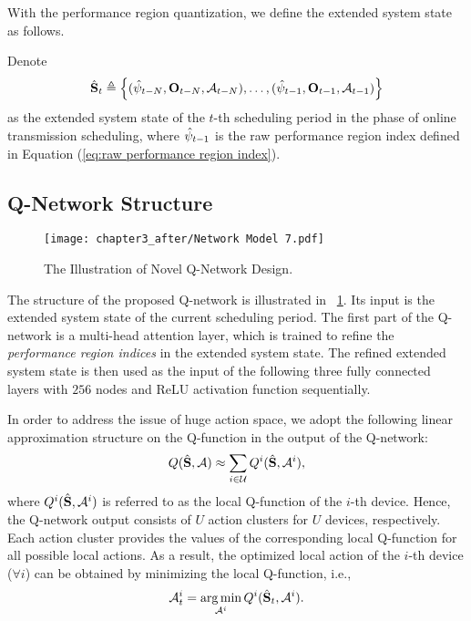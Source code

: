 With the performance region quantization, we define the extended system state as follows.
\begin{definition}
   Denote 
   $$
   \hat{\mathbf{S}}_t \triangleq 
   \left\{
      (\hat{\psi}_{t-N}, \mathbf{O}_{t-N},\mathcal{A}_{t-N})
      ,\ldots,
      (\hat{\psi}_{t-1}, \mathbf{O}_{t-1}, \mathcal{A}_{t-1})
   \right\}
   $$
   as the extended system state of the $t$-th scheduling period in the phase of online transmission scheduling, where $\hat{\psi}_{t-1}$ is the raw performance region index defined in Equation (\ref{eq:raw performance region index}).
\end{definition}

\subsection{Q-Network Structure}
\label{sec:Q-network}
\begin{figure}[!t]
   \centering
   \texttt{[image: chapter3\_after/Network Model 7.pdf]}
   \caption{The Illustration of Novel Q-Network Design.}
   \label{fig:Network Design}
\end{figure}

The structure of the proposed Q-network is illustrated in \figurename~\ref{fig:Network Design}. Its input is the extended system state of the current scheduling period. The first part of the Q-network is a multi-head attention layer\cite{vaswani2017attention},  which is trained to refine the \emph{performance region indices} in the extended system state. The refined extended system state is then used as the input of the following three fully connected layers with $256$ nodes and ReLU activation function sequentially.

In order to address the issue of huge action space, we adopt the following linear approximation structure on the Q-function in the output of the Q-network:
\begin{equation}
   Q(\hat{\mathbf{S}}, \mathcal{A})
   \approx
   \sum_{{i} \in \mathcal{U}} Q^{i}(\hat{\mathbf{S}}, \mathcal{A}^{i}),
\end{equation}
where $Q^{i}(\hat{\mathbf{S}}, \mathcal{A}^{i})$ is referred to as the local Q-function of the ${i}$-th device. Hence, the Q-network output consists of $U$ action clusters for $U$ devices, respectively. Each action cluster provides the values of the corresponding local Q-function for all possible local actions. As a result, the optimized local action of the $i$-th device ($\forall i$) can be obtained by minimizing the local Q-function, i.e.,
\begin{equation}
   \mathcal{A}^{i}_t = \operatorname*{arg\,min}\limits_{\mathcal{A}^{i}} Q^{i}(\hat{\mathbf{S}}_t, \mathcal{A}^{i}).
\end{equation}

